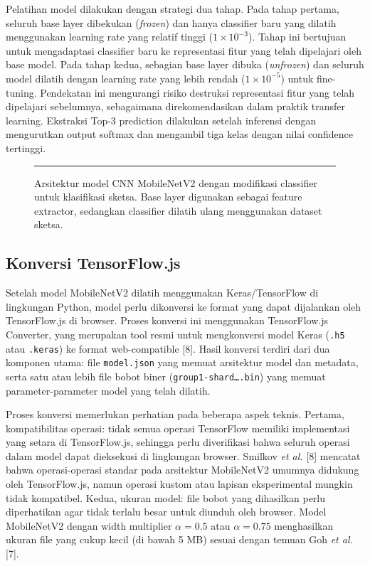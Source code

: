 \documentclass[12pt,oneside]{report}
\begin{document}
Pelatihan model dilakukan dengan strategi dua tahap. Pada tahap pertama, seluruh base layer dibekukan (\textit{frozen}) dan hanya classifier baru yang dilatih menggunakan learning rate yang relatif tinggi ($1 \times 10^{-3}$). Tahap ini bertujuan untuk mengadaptasi classifier baru ke representasi fitur yang telah dipelajari oleh base model. Pada tahap kedua, sebagian base layer dibuka (\textit{unfrozen}) dan seluruh model dilatih dengan learning rate yang lebih rendah ($1 \times 10^{-5}$) untuk fine-tuning. Pendekatan ini mengurangi risiko destruksi representasi fitur yang telah dipelajari sebelumnya, sebagaimana direkomendasikan dalam praktik transfer learning. Ekstraksi Top-3 prediction dilakukan setelah inferensi dengan mengurutkan output softmax dan mengambil tiga kelas dengan nilai confidence tertinggi.

\begin{figure}[H]
\centering
\rule{0.9\textwidth}{8cm}
\caption{Arsitektur model CNN MobileNetV2 dengan modifikasi classifier untuk klasifikasi sketsa. Base layer digunakan sebagai feature extractor, sedangkan classifier dilatih ulang menggunakan dataset sketsa.}
\label{fig:arsitektur-model}
\end{figure}

\subsection{Konversi TensorFlow.js}
\label{subsec:konversi-tfjs}

Setelah model MobileNetV2 dilatih menggunakan Keras/TensorFlow di lingkungan Python, model perlu dikonversi ke format yang dapat dijalankan oleh TensorFlow.js di browser. Proses konversi ini menggunakan TensorFlow.js Converter, yang merupakan tool resmi untuk mengkonversi model Keras (\texttt{.h5} atau \texttt{.keras}) ke format web-compatible [8]. Hasil konversi terdiri dari dua komponen utama: file \texttt{model.json} yang memuat arsitektur model dan metadata, serta satu atau lebih file bobot biner (\texttt{group1-shard\dots.bin}) yang memuat parameter-parameter model yang telah dilatih.

Proses konversi memerlukan perhatian pada beberapa aspek teknis. Pertama, kompatibilitas operasi: tidak semua operasi TensorFlow memiliki implementasi yang setara di TensorFlow.js, sehingga perlu diverifikasi bahwa seluruh operasi dalam model dapat dieksekusi di lingkungan browser. Smilkov \textit{et al.} [8] mencatat bahwa operasi-operasi standar pada arsitektur MobileNetV2 umumnya didukung oleh TensorFlow.js, namun operasi kustom atau lapisan eksperimental mungkin tidak kompatibel. Kedua, ukuran model: file bobot yang dihasilkan perlu diperhatikan agar tidak terlalu besar untuk diunduh oleh browser. Model MobileNetV2 dengan width multiplier $\alpha = 0.5$ atau $\alpha = 0.75$ menghasilkan ukuran file yang cukup kecil (di bawah 5 MB) sesuai dengan temuan Goh \textit{et al.} [7].
\end{document}
